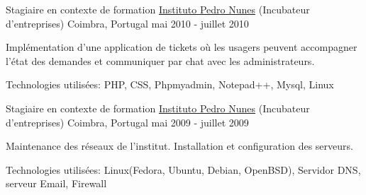 \begin{cventries}

\cventry
{Stagiaire en contexte de formation} %
{\href{https://www.ipn.pt/}{Instituto Pedro Nunes} (Incubateur d'entreprises)} %
{Coimbra, Portugal} %
{mai 2010 - juillet 2010} %
{ %
\begin{cvitems}
\item {Implémentation d’une application de tickets où les usagers peuvent accompagner l’état des demandes et communiquer par chat avec les administrateurs.}
\item{Technologies utilisées: PHP, CSS, Phpmyadmin, Notepad++, Mysql, Linux }
\end{cvitems}
}


\cventry
{Stagiaire en contexte de formation} %
{\href{https://www.ipn.pt/}{Instituto Pedro Nunes} (Incubateur d'entreprises)} %
{Coimbra, Portugal} %
{mai 2009 - juillet 2009} %
{ %
\begin{cvitems}
\item {Maintenance des réseaux de l’institut. Installation et configuration des serveurs.}
\item{Technologies utilisées: Linux(Fedora, Ubuntu, Debian, OpenBSD), Servidor DNS, serveur Email, Firewall}
\end{cvitems}
}




\end{cventries}
